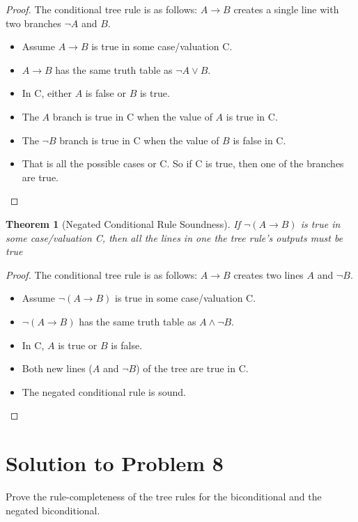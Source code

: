 \documentclass[12pt]{article}
\newtheorem{theorem}{Theorem}
\begin{document}
\begin{proof}
    The conditional tree rule is as follows: $A \rightarrow B$ creates a single line with two branches $\neg A$ and $B$. 
    \begin{itemize}
        \item Assume $A \rightarrow B$ is true in some case/valuation C.
        \item $A \rightarrow B$ has the same truth table as $\neg A \lor B$.
        \item In C, either $A$ is false or $B$ is true.
        \item The $A$ branch is true in C when the value of $A$ is true in C.
        \item The $\neg B$ branch is true in C when the value of $B$ is false in C.
        \item That is all the possible cases or C. So if C is true, then one of the branches are true. 
    \end{itemize}
\end{proof}


\begin{theorem}[Negated Conditional Rule Soundness]
    If $\neg (A \rightarrow B)$ is true in some case/valuation C, then all the lines in one the tree rule's outputs must be true
\end{theorem}

\begin{proof}
    The conditional tree rule is as follows: $A \rightarrow B$ creates two lines $A$ and $\neg B$. 
    \begin{itemize}
        \item Assume $\neg(A \rightarrow B)$ is true in some case/valuation C.
        \item $\neg (A \rightarrow B)$ has the same truth table as $A \land \neg B$.
        \item In C, $A$ is true or $B$ is false.
        \item Both new lines ($A$ and $\neg B$) of the tree are true in C.
        \item The negated conditional rule is sound.
    \end{itemize}
\end{proof}

\section*{Solution to Problem 8}
 Prove the rule-completeness of the tree rules for the biconditional and the negated biconditional.  
 
\end{document}

